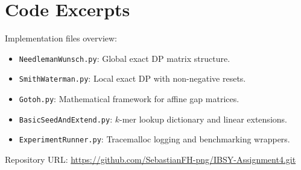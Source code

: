 \documentclass[Assignment,MME,english]{twbook}
\begin{document}
\chapter{Code Excerpts}
Implementation files overview:
\begin{itemize}
    \item \texttt{NeedlemanWunsch.py}: Global exact DP matrix structure.
    \item \texttt{SmithWaterman.py}: Local exact DP with non-negative resets.
    \item \texttt{Gotoh.py}: Mathematical framework for affine gap matrices.
    \item \texttt{BasicSeedAndExtend.py}: $k$-mer lookup dictionary and linear extensions.
    \item \texttt{ExperimentRunner.py}: Tracemalloc logging and benchmarking wrappers.
\end{itemize}

Repository URL: \href{https://github.com/SebastianFH-png/IBSY-Assignment4.git}{https://github.com/SebastianFH-png/IBSY-Assignment4.git}
\end{document}
